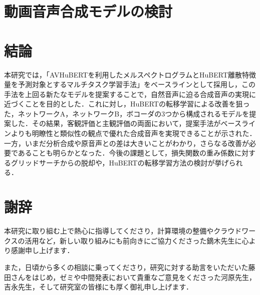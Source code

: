\documentclass[12pt]{jarticle}
\numberwithin{equation}{section}    %
\numberwithin{figure}{section}      %
\numberwithin{table}{section}      %
\begin{document}
\clearpage

\section{動画音声合成モデルの検討}





\clearpage

\section{結論}
本研究では，「AVHuBERTを利用したメルスペクトログラムとHuBERT離散特徴量を予測対象とするマルチタスク学習手法」をベースラインとして採用し，この手法を上回る新たなモデルを提案することで，自然音声に迫る合成音声の実現に近づくことを目的とした．これに対し，HuBERTの転移学習による改善を狙った，ネットワークA，ネットワークB，ボコーダの3つから構成されるモデルを提案した．その結果，客観評価と主観評価の両面において，提案手法がベースラインよりも明瞭性と類似性の観点で優れた合成音声を実現できることが示された．一方，いまだ分析合成や原音声との差は大きいことがわかり，さらなる改善が必要であることも明らかとなった．今後の課題として，損失関数の重み係数に対するグリッドサーチからの脱却や，HuBERTの転移学習方法の検討が挙げられる．

\clearpage

\section*{謝辞}
本研究に取り組む上で熱心に指導してくださり，計算環境の整備やクラウドワークスの活用など，新しい取り組みにも前向きにご協力くださった鏑木先生に心より感謝申し上げます．

また，日頃から多くの相談に乗ってくださり，研究に対する助言をいただいた藤田さんをはじめ，ゼミや中間発表において貴重なご意見をくださった河原先生，吉永先生，そして研究室の皆様にも厚く御礼申し上げます．

\clearpage



\end{document}
